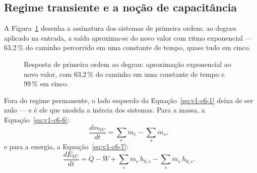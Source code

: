 \documentclass[12pt,a4paper]{article}
\numberwithin{equation}{section}
\numberwithin{table}{section}
\numberwithin{figure}{section}
\begin{document}
\subsection{Regime transiente e a noção de
capacitância}\label{sub:v1-c6-transiente}

A Figura~\ref{fig:v1-c6-2} desenha a assinatura dos sistemas de primeira
ordem: ao degrau aplicado na entrada, a saída aproxima-se do novo valor com
ritmo exponencial --- 63,2\,\% do caminho percorrido em uma constante de
tempo, quase tudo em cinco.

\begin{figure}[H]
\centering
{}
\caption[Resposta de primeira ordem ao degrau.]{Resposta de primeira ordem
ao degrau: aproximação exponencial ao novo valor, com 63,2\,\% do caminho em
uma constante de tempo e 99\,\% em cinco.}
\label{fig:v1-c6-2}
\end{figure}


Fora do regime permanente, o lado esquerdo da
Equação~\eqref{eq:v1-c6-1} deixa de ser nulo --- e é ele que modela a
inércia dos sistemas. Para a massa, a Equação~\eqref{eq:v1-c6-6}:
\begin{equation}\label{eq:v1-c6-6}
\frac{dm_{VC}}{dt} = \sum_e \dot{m}_e - \sum_s \dot{m}_s ,
\end{equation}
e para a energia, a Equação~\eqref{eq:v1-c6-7}:
\begin{equation}\label{eq:v1-c6-7}
\frac{dE_{VC}}{dt} = \dot{Q} - \dot{W} + \sum_e \dot{m}_e\,h_{0,e} -
\sum_s \dot{m}_s\,h_{0,s} .
\end{equation}
\end{document}
